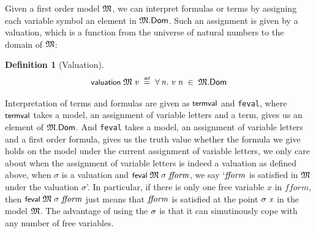 \documentclass[letterpaper]{article}
\newtheorem{defn}{Definition}
\renewcommand{\HOLConst}[1]{{\textsf{\upshape\small #1}}}
\renewcommand{\HOLinline}[1]{\ensuremath{#1}}
\newenvironment{holmath}{\begin{displaymath}\begin{array}{l}}{\end{array}\end{displaymath}\ignorespacesafterend}
\begin{document}
Given a first order model \HOLinline{\HOLFreeVar{\ensuremath{\mathfrak{M}}}}, we can interpret formulas or terms by assigning each variable symbol an element in \HOLinline{\HOLFreeVar{\ensuremath{\mathfrak{M}}}.\HOLFieldName{Dom}}. Such an assignment is given by a valuation, which is a function from the universe of natural numbers to the domain of \HOLinline{\HOLFreeVar{\ensuremath{\mathfrak{M}}}}:
\begin{defn}[Valuation]
\begin{holmath}
  \HOLConst{valuation}\;\HOLFreeVar{\ensuremath{\mathfrak{M}}}\;\HOLFreeVar{v}\;\HOLSymConst{\HOLTokenDefEquality{}}\;\HOLSymConst{\HOLTokenForall{}}\HOLBoundVar{n}.\;\HOLFreeVar{v}\;\HOLBoundVar{n}\;\HOLSymConst{\HOLTokenIn{}}\;\HOLFreeVar{\ensuremath{\mathfrak{M}}}.\HOLFieldName{Dom}
\end{holmath} 
\end{defn}

Interpretation of terms and formulas are given as \HOLinline{\HOLConst{termval}} and \texttt{feval}, where \HOLinline{\HOLConst{termval}} takes a model, an assignment of variable letters and a term, gives us an element of \HOLinline{\HOLFreeVar{\ensuremath{\mathfrak{M}}}.\HOLFieldName{Dom}}. And \texttt{feval} takes a model, an assignment of variable letters and a first order formula, gives us the truth value whether the formula we give holds on the model under the current assignment of variable letters, we only care about when the assignment of variable letters is indeed a valuation as defined above, when $\sigma$ is a valuation and \HOLinline{\HOLConst{feval}\;\HOLFreeVar{\ensuremath{\mathfrak{M}}}\;\HOLFreeVar{\ensuremath{\sigma}}\;\HOLFreeVar{fform}}, we say `\HOLinline{\HOLFreeVar{fform}} is satisfied in \HOLinline{\HOLFreeVar{\ensuremath{\mathfrak{M}}}} under the valuation $\sigma$'. In particular, if there is only one free variable $x$ in $fform$, then \HOLinline{\HOLConst{feval}\;\HOLFreeVar{\ensuremath{\mathfrak{M}}}\;\HOLFreeVar{\ensuremath{\sigma}}\;\HOLFreeVar{fform}} just means that \HOLinline{\HOLFreeVar{fform}} is satisfied at the point \HOLinline{\HOLFreeVar{\ensuremath{\sigma}}\;\HOLFreeVar{x}} in the model \HOLinline{\HOLFreeVar{\ensuremath{\mathfrak{M}}}}. The advantage of using the \HOLinline{\HOLFreeVar{\ensuremath{\sigma}}} is that it can simutinously cope with any number of free variables. 
\end{document}
